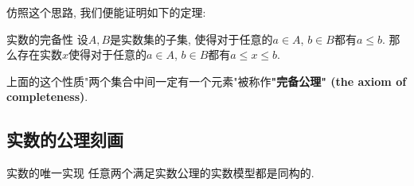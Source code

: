 仿照这个思路, 我们便能证明如下的定理:

\begin{theorem}{实数的完备性}
设$A,B$是实数集的子集, 使得对于任意的$a\in A$, $b\in B$都有$a\leq b$. 那么存在实数$x$使得对于任意的$a\in A$, $b\in B$都有$a\leq x\leq b$.
\end{theorem}

上面的这个性质"两个集合中间一定有一个元素"被称作\textbf{"完备公理" (the axiom of completeness)}.

\subsection{实数的公理刻画}

\begin{theorem}{实数的唯一实现}
任意两个满足实数公理的实数模型都是同构的.
\end{theorem}